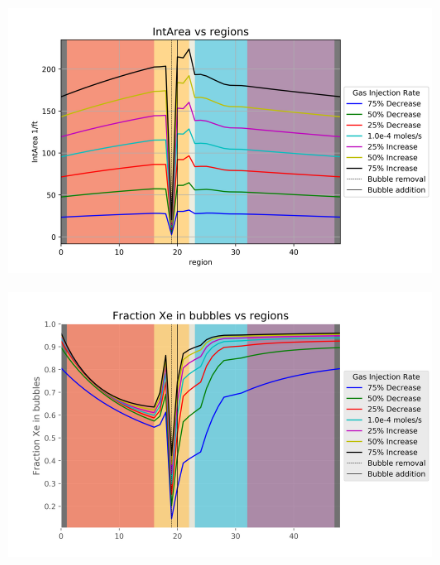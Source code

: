 \begin{figure}[p] 
\centering
\begin{minipage}{.5\textwidth}
  \centering
  \includegraphics[width=1.0\linewidth]{images/RateIntArea.png}
  \label{fig:RateIntAreaCon}
\end{minipage}%
\begin{minipage}{.5\textwidth}
  \centering
  \includegraphics[width=1.0\linewidth]{images/RateFractionXeInBubbles.png}
  \label{fig:RatePercentXe}
\end{minipage}
\end{figure}

\FloatBarrier
\newpage
\FloatBarrier

